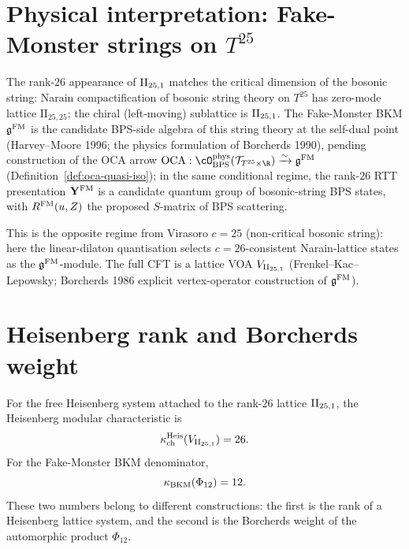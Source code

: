 \section{Physical interpretation: Fake-Monster strings on \texorpdfstring{$T^{25}$}{T-25}}
\label{sec:fm-physics}

\begin{remark}
\label{rem:fm-bosonic-string}
The rank-$26$ appearance of $\mathrm{II}_{25,1}$ matches the critical dimension
of the bosonic string: Narain compactification of bosonic string
theory on $T^{25}$ has zero-mode lattice $\mathrm{II}_{25,25}$; the
chiral (left-moving) sublattice is $\mathrm{II}_{25,1}$. The Fake-Monster BKM
$\mathfrak{g}^{\mathrm{FM}}$ is the candidate BPS-side algebra of this string theory at the
self-dual point (Harvey--Moore 1996; the physics formulation of
Borcherds 1990), pending construction of the OCA arrow
$\mathrm{OCA}: \cO^{\mathrm{phys}}_{\mathrm{BPS}}(\mathcal T_{T^{25}\times\R})
\xrightarrow{\sim} \gFM$ (Definition~\ref{def:oca-quasi-iso});
in the same conditional regime, the rank-$26$ RTT presentation
$\mathbf{Y}^{\mathrm{FM}}$ is a candidate quantum group of bosonic-string BPS states,
with $R^{\mathrm{FM}}(u, Z)$ the proposed $S$-matrix of BPS scattering.

This is the opposite regime from Virasoro $c = 25$ (non-critical bosonic string): here the linear-dilaton quantisation selects $c = 26$-consistent Narain-lattice states as the $\mathfrak{g}^{\mathrm{FM}}$-module. The full CFT is a lattice VOA $V_{\mathrm{II}_{25,1}}$ (Frenkel--Kac--Lepowsky; Borcherds 1986 explicit vertex-operator construction of $\mathfrak{g}^{\mathrm{FM}}$).
\end{remark}

\section{Heisenberg rank and Borcherds weight}
\label{sec:fm-cross-volume}

\begin{proposition}
\label{prop:fm-vol-i-consistency}
For the free Heisenberg system attached to the rank-$26$ lattice
$\mathrm{II}_{25,1}$, the Heisenberg modular characteristic is
\[
 \kappa_{\mathrm{ch}}^{\mathrm{Heis}}(V_{\mathrm{II}_{25,1}})=26.
\]
For the Fake-Monster BKM denominator,
\[
 \kappa_{\mathrm{BKM}}(\Phi_{12})=12.
\]
These two numbers belong to different constructions: the first is the
rank of a Heisenberg lattice system, and the second is the Borcherds
weight of the automorphic product $\Phi_{12}$.
\end{proposition}

